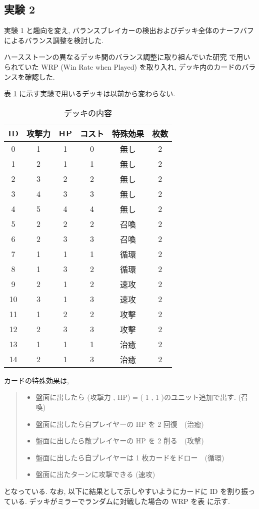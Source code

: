 \documentclass{jarticle}     %
\begin{document}
\subsection{実験 2 }
実験 1 と趣向を変え, バランスブレイカーの検出およびデッキ全体のナーフバフによるバランス調整を検討した.\par
ハースストーンの異なるデッキ間のバランス調整に取り組んでいた研究\cite{Hearthstone} で用いられていた WRP (Win Rate when Played) を取り入れ, デッキ内のカードのバランスを確認した. 

表 \ref{table:deck} に示す実験で用いるデッキは以前から変わらない. 
\begin{table}[h]
  \centering
  \caption{デッキの内容}
  \label{table:deck}
  \begin{tabular}{|c|c|c|c|c|c|}
  \hline
  ID & 攻撃力 & HP & コスト & 特殊効果 & 枚数 \\ \hline
  0 & 1 & 1 & 0 & 無し & 2 \\ \hline
  1 & 2 & 1 & 1 & 無し & 2 \\ \hline
  2 & 3 & 2 & 2 & 無し & 2 \\ \hline
  3 & 4 & 3 & 3 & 無し & 2 \\ \hline
  4 & 5 & 4 & 4 & 無し & 2 \\ \hline
  5 & 2 & 2 & 2 & 召喚 & 2 \\ \hline
  6 & 2 & 3 & 3 & 召喚 & 2 \\ \hline
  7 & 1 & 1 & 1 & 循環 & 2 \\ \hline
  8 & 1 & 3 & 2 & 循環 & 2 \\ \hline
  9 & 2 & 1 & 2 & 速攻 & 2 \\ \hline
  10 & 3 & 1 & 3 & 速攻 & 2 \\ \hline
  11 & 1 & 2 & 2 & 攻撃 & 2 \\ \hline
  12 & 2 & 3 & 3 & 攻撃 & 2 \\ \hline
  13 & 1 & 1 & 1 & 治癒 & 2 \\ \hline
  14 & 2 & 1 & 3 & 治癒 & 2 \\ \hline
  \end{tabular}
  \end{table}

  カードの特殊効果は, 
  \begin{quote}
    \begin{itemize}
     \item 盤面に出したら (攻撃力 , HP) = ( 1 , 1 )のユニット追加で出す. (召喚)
     \item 盤面に出したら自プレイヤーの HP を 2 回復　(治癒)
     \item 盤面に出したら敵プレイヤーの HP を 2 削る　(攻撃)
     \item 盤面に出したら自プレイヤーは 1 枚カードをドロー　(循環)
     \item 盤面に出たターンに攻撃できる (速攻)
    \end{itemize}
   \end{quote}
   となっている.
  なお, 以下に結果として示しやすいようにカードに ID を割り振っている.
  デッキがミラーでランダムに対戦した場合の WRP を表 に示す. 
\end{document}
